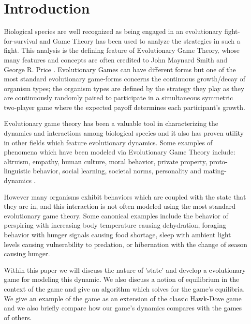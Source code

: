 
\section{Introduction}
Biological species are well recognized as being engaged in an evolutionary fight-for-survival and Game Theory has been used to analyze the strategies in such a fight.
This analysis is the defining feature of Evolutionary Game Theory, whose many features and concepts are often credited to John Maynard Smith and George R. Price \cite{maynard,maynard2}.
Evolutionary Games can have different forms but one of the most standard evolutionary game-forms concerns the continuous growth/decay of organism types; the organism types are defined by the strategy they play as they are continuously randomly paired to participate in a simultaneous symmetric two-player game where the expected payoff determines each participant's growth.\cite{weibull}

Evolutionary game theory has been a valuable tool in characterizing the dynamics and interactions among biological species and it also has proven utility in other fields which feature evolutionary dynamics.  Some examples of phenomena which have been modeled via Evolutionary Game Theory include: altruism, empathy, human culture, moral behavior, private property, proto-linguistic behavior, social learning, societal norms, personality and mating-dynamics \cite{sep-game-evolutionary,socialpsyc1,Hodgson2012,McNamara953}.

However many organisms exhibit behaviors which are coupled with the state that they are in, and this interaction is not often modeled using the most standard evolutionary game theory.
Some canonical examples include the behavior of perspiring with increasing body temperature causing dehydration, foraging behavior with hunger signals causing food shortage, sleep with ambient light levels causing vulnerability to predation, or hibernation with the change of season causing hunger.

Within this paper we will discuss the nature of 'state' and develop a evolutionary game for modeling this dynamic. We also discuss a notion of equilibrium in the context of the game and give an algorithm which solves for the game's equilibria. We give an example of the game as an extension of the classic Hawk-Dove game\cite{maynard} and we also briefly compare how our game's dynamics compares with the games of others.

